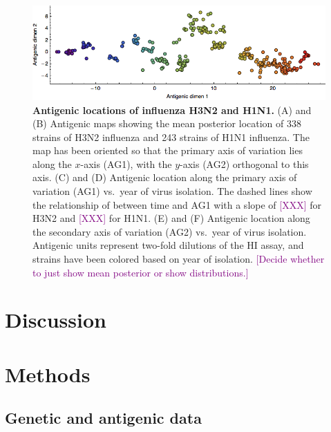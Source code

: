 \documentclass[11pt,oneside,letterpaper]{article}
\def\tbc#1{\textcolor{purple}{[#1]}}
\begin{document}
\begin{figure}[tb]
	\centering		
	\includegraphics[width=\textwidth]{figures/mds}
	\caption{\textbf{Antigenic locations of influenza H3N2 and H1N1.} (A) and (B) Antigenic maps showing the mean posterior location of 338 strains of H3N2 influenza and 243 strains of H1N1 influenza.  
	The map has been oriented so that the primary axis of variation lies along the $x$-axis (AG1), with the $y$-axis (AG2) orthogonal to this axis.  
	(C) and (D) Antigenic location along the primary axis of variation (AG1) vs.\ year of virus isolation.  
	The dashed lines show the relationship of between time and AG1 with a slope of \tbc{XXX} for H3N2 and \tbc{XXX} for H1N1.  
	(E) and (F) Antigenic location along the secondary axis of variation (AG2) vs.\ year of virus isolation.  
	Antigenic units represent two-fold dilutions of the HI assay, and strains have been colored based on year of isolation.  
	\tbc{Decide whether to just show mean posterior or show distributions.}
	} 
	\label{mds} 
\end{figure}

\section*{Discussion}

\section*{Methods}

\subsection*{Genetic and antigenic data}
\end{document}
